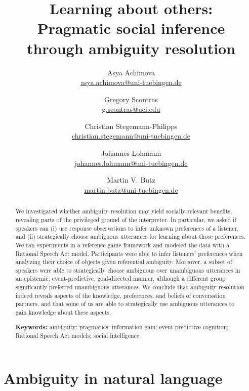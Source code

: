 \documentclass[11pt,a4paper]{article}
\title{Learning about others:\\
	Pragmatic social inference \\ through ambiguity resolution
}
\author{
		Asya Achimova\\
		\href{mailto:asya.achimova@uni-tuebingen.de}{asya.achimova@uni-tuebingen.de}
	\and
		Gregory Scontras\\
		\href{mailto:g.scontras@uci.edu}{g.scontras@uci.edu}
	\and 
		Christian Stegemann-Philipps\\
		\href{mailto:christian.stegemann@uni-tuebingen.de}{christian.stegemann@uni-tuebingen.de}
	\and
		Johannes Lohmann\\
		\href{mailto:johannes.lohmann@uni-tuebingen.de}{johannes.lohmann@uni-tuebingen.de}
	\and
		Martin V. Butz \\
		\href{mailto:martin.butz@uni-tuebingen.de}{martin.butz@uni-tuebingen.de}
}
\begin{document}
\maketitle

\begin{abstract}

We investigated whether ambiguity resolution may yield socially-relevant benefits,
revealing parts of the privileged ground of the interpreter. 
In particular, we asked if speakers can (i) use response observations to infer unknown preferences of a listener, and (ii) strategically choose ambiguous utterances for learning about those preferences. 
We ran experiments in a reference game framework and modeled the data with a Rational Speech Act model.
Participants were able to infer listeners' preferences when analyzing their choice of objects given referential ambiguity.
Moreover, a subset of speakers were able to strategically choose ambiguous over unambiguous utterances in an epistemic, event-predictive, goal-directed manner, although a different group significantly preferred unambiguous utterances. 
We conclude that ambiguity resolution indeed reveals aspects of the knowledge, preferences, and beliefs of conversation partners, and that some of us are able to strategically use ambiguous utterances to gain knowledge about these aspects.
                                                                 

\textbf{Keywords:} 
ambiguity; pragmatics; information gain; event-predictive cognition; Rational Speech Act models; social intelligence
\end{abstract}

\section{Ambiguity in natural language}

\noindent 
\end{document}

